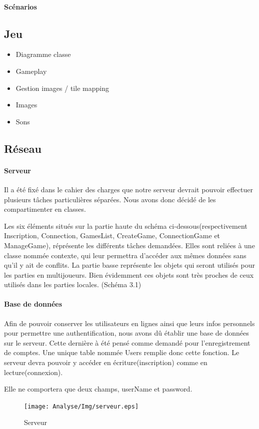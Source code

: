 	\paragraph{Scénarios}
			

\subsection{Jeu}
	\begin{itemize}
		\item{Diagramme classe}
		\item{Gameplay}
		\item{Gestion images / tile mapping}
		\item{Images}
		\item{Sons}
	\end{itemize}
			

\subsection{Réseau}
		
	\paragraph{Serveur\\}
			
		Il a été fixé dans le cahier des charges que notre serveur devrait pouvoir
		effectuer plusieurs tâches particulières séparées. Nous avons donc décidé de
		les compartimenter en classes.
			
		Les six éléments situés sur la partie haute du schéma
		ci-dessous(respectivement Inscription, Connection, GamesList, CreateGame,
		ConnectionGame et ManageGame), réprésente les différents tâches demandées.
		Elles sont reliées à une classe nommée contexte, qui leur permettra d'accéder
		aux mêmes données sans qu'il y ait de conflits. La partie basse représente les
		objets qui seront utilisés pour les parties en multijoueurs. Bien évidemment
		ces objets sont très proches de ceux utilisés dans les parties
		locales.
		(Schéma 3.1)
		
	\paragraph{Base de données\\}
		Afin de pouvoir conserver les utilisateurs en lignes ainsi que leurs infos
		personnels pour permettre une authentification, nous avons dû établir une
		base de données sur le serveur. Cette dernière à été pensé comme demandé pour 
		l'enregistrement de comptes. Une unique table nommée Users remplie donc cette
		fonction. Le serveur devra pouvoir y accéder en écriture(inscription) comme
		en lecture(connexion).
			
		Elle ne comportera que deux champs, userName et password.
			
		\begin{figure}
			\texttt{[image: Analyse/Img/serveur.eps]}
			 \caption {Serveur}
		\end{figure}
		
		\newpage
		
	